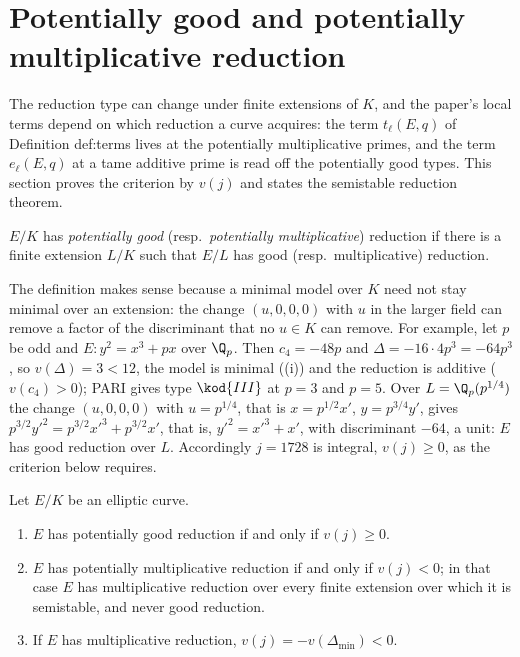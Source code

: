 \section{Potentially good and potentially multiplicative reduction}\label{sec:reduction:potential}

The reduction type can change under finite extensions of $K$, and the paper's local terms depend on which
reduction a curve acquires: the term $t_\ell(E,q)$ of Definition def:terms lives at the potentially
multiplicative primes, and the term $e_\ell(E,q)$ at a tame additive prime is read off the potentially good
types. This section proves the criterion by $v(j)$ and states the semistable reduction theorem.

\begin{definition}\label{def:reduction:potential}
$E/K$ has \emph{potentially good} (resp.\ \emph{potentially multiplicative}) reduction if there is a finite
extension $L/K$ such that $E/L$ has good (resp.\ multiplicative) reduction.
\end{definition}

The definition makes sense because a minimal model over $K$ need not stay minimal over an extension: the change
$(u,0,0,0)$ with $u$ in the larger field can remove a factor of the discriminant that no $u\in K$ can remove. For
example, let $p$ be odd and $E\colon y^2=x^3+px$ over $\Q_p$. Then $c_4=-48p$ and $\Delta=-16\cdot4p^3=-64p^3$, so $v(\Delta)=3<12$,
the model is minimal ((i)) and the reduction is additive ($v(c_4)>0$); PARI gives type
$\kod{III}$ at $p=3$ and $p=5$. Over $L=\Q_p(p^{1/4})$ the change $(u,0,0,0)$ with $u=p^{1/4}$, that is $x=p^{1/2}x'$, $y=p^{3/4}y'$,
gives $p^{3/2}y'^2=p^{3/2}x'^3+p^{3/2}x'$, that is, $y'^2=x'^3+x'$, with discriminant $-64$, a unit: $E$ has good reduction over $L$.
Accordingly $j=1728$ is integral, $v(j)\ge0$, as the criterion below requires.

\begin{theorem}\label{thm:reduction:potential-criterion}
Let $E/K$ be an elliptic curve.
\begin{enumerate}[label=(\roman*)]
\item $E$ has potentially good reduction if and only if $v(j)\ge0$.
\item $E$ has potentially multiplicative reduction if and only if $v(j)<0$; in that case $E$ has multiplicative
reduction over every finite extension over which it is semistable, and never good reduction.
\item If $E$ has multiplicative reduction, $v(j)=-v(\Delta_{\min})<0$.
\end{enumerate}
\end{theorem}

